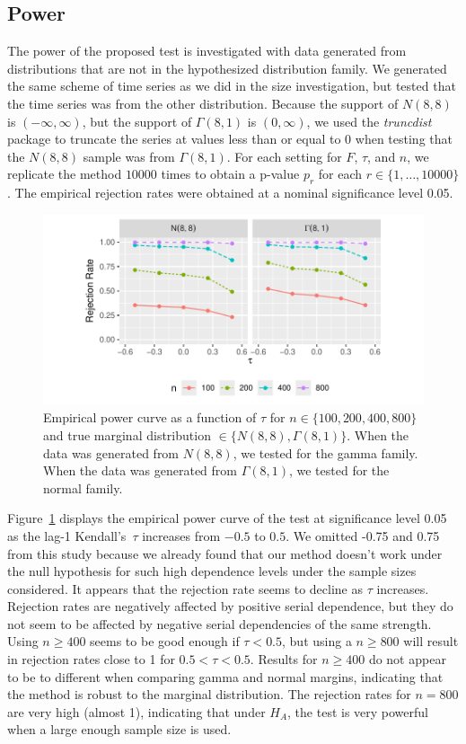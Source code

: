 \documentclass[12pt]{article}
\begin{document}
\subsection{Power}
The power of the proposed test is investigated with data generated from
distributions that are not in the hypothesized distribution family.
We generated the same scheme of time series as we did in the size investigation,
but tested that the time series was from the other distribution.
Because the support of $N(8, 8)$ is
$(-\infty, \infty)$, but the support of $\Gamma(8, 1)$ is $(0, \infty)$, we used
the \textsl{truncdist} package \citep{truncdist} to truncate the series at
values less than or equal to 0 when testing that the $N(8, 8)$ sample was
from $\Gamma(8, 1)$. For each setting for $F$, $\tau$, and $n$, we replicate the
method $10000$ times
to obtain a p-value $p_r$ for each $r \in \{1, \ldots, 10000\}$.
The empirical rejection rates were obtained at a nominal significance level 0.05.

\begin{figure}[tbp]
  \centering
  \includegraphics[scale=1]{figures/rr}
  \caption{Empirical power curve as a function of $\tau$ for
    $n \in \{100, 200, 400, 800\}$ and true marginal distribution
    $\in \{N(8,8), \Gamma(8,1)\}$. When the data was generated from $N(8,8)$,
    we tested for the gamma family. When the data was generated from
    $\Gamma(8,1)$, we tested for the normal family.
  }
  \label{fig:rr}
\end{figure}


Figure~\ref{fig:rr} displays the empirical power curve of the test at
significance level 0.05 as the lag-1 Kendall's~$\tau$ increases from
$-0.5$ to $0.5$. We omitted -0.75 and 0.75 from this study because we already
found that our method doesn't work under the null hypothesis for such high
dependence levels under the sample sizes considered. It appears that the
rejection rate seems to decline as $\tau$
increases. Rejection rates are negatively affected by positive serial
dependence, but they do not seem to be affected by negative serial dependencies
of the same strength.
Using $n \geq 400$ seems to be good enough
if $\tau < 0.5$, but using a $n \geq 800$ will result in
rejection rates close to 1 for $0.5 < \tau < 0.5$.
Results for $n \geq 400$
do not appear to be to different when comparing gamma and normal
margins, indicating that the method is robust to the marginal distribution.
The rejection rates for $n = 800$ are very
high (almost 1), indicating that under $H_A$, the test is very powerful
when a large enough sample size is used.
\end{document}
